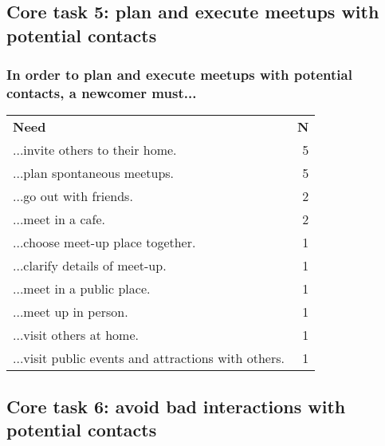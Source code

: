 \subsection*{Core task 5: plan and execute meetups with potential contacts}

\subsubsection*{In order to plan and execute meetups with potential contacts, a newcomer must...}

\begin{longtable}{p{}r}
\textbf{Need}                                                                                              & \textbf{N} \\[12pt]
  ...invite others to their home.                                                                          & 5 \\
  ...plan spontaneous meetups.                                                                             & 5 \\
  ...go out with friends.                                                                                  & 2 \\
  ...meet in a cafe.                                                                                       & 2 \\
  ...choose meet-up place together.                                                                        & 1 \\
  ...clarify details of meet-up.                                                                           & 1 \\
  ...meet in a public place.                                                                               & 1 \\
  ...meet up in person.                                                                                    & 1 \\
  ...visit others at home.                                                                                 & 1 \\
  ...visit public events and attractions with others.                                                      & 1 \\[12pt]
\end{longtable}

\subsection*{Core task 6: avoid bad interactions with potential contacts}

